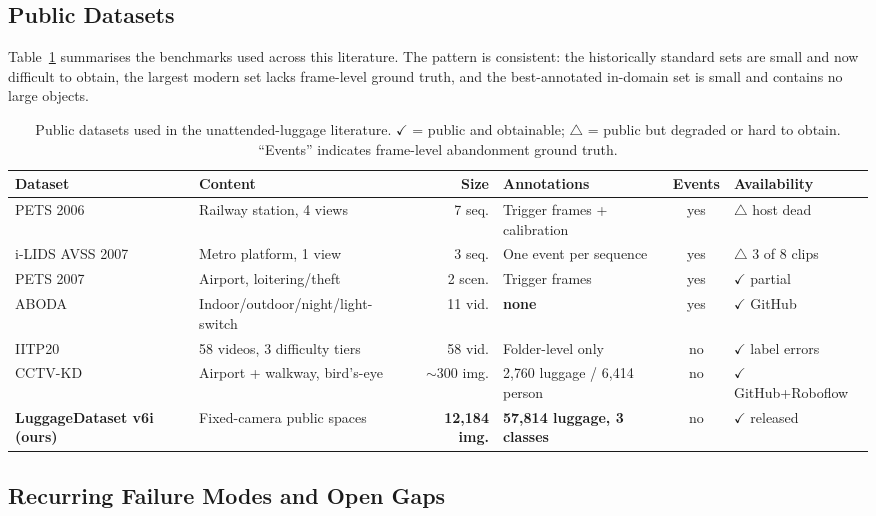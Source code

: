 \documentclass[10pt,twocolumn,a4paper]{article}
\begin{document}
\subsection{Public Datasets}

Table~\ref{tab:datasets} summarises the benchmarks used across this literature.
The pattern is consistent: the historically standard sets are small and now
difficult to obtain, the largest modern set lacks frame-level ground truth, and
the best-annotated in-domain set is small and contains no large objects.

\begin{table}[t]
\centering
\caption{Public datasets used in the unattended-luggage literature.
$\checkmark$ = public and obtainable; $\triangle$ = public but degraded or hard to
obtain. ``Events'' indicates frame-level abandonment ground truth.}
\label{tab:datasets}
\footnotesize
\setlength{\tabcolsep}{5pt}
\begin{tabular}{@{}l l r l c l@{}}
\toprule
\textbf{Dataset} & \textbf{Content} & \textbf{Size} & \textbf{Annotations} & \textbf{Events} & \textbf{Availability} \\
\midrule
PETS 2006 & Railway station, 4 views & 7 seq. & Trigger frames + calibration & yes & $\triangle$ host dead \\
i-LIDS AVSS 2007 & Metro platform, 1 view & 3 seq. & One event per sequence & yes & $\triangle$ 3 of 8 clips \\
PETS 2007 & Airport, loitering/theft & 2 scen. & Trigger frames & yes & $\checkmark$ partial \\
ABODA & Indoor/outdoor/night/light-switch & 11 vid. & \textbf{none} & yes & $\checkmark$ GitHub \\
IITP20 & 58 videos, 3 difficulty tiers & 58 vid. & Folder-level only & no & $\checkmark$ label errors \\
CCTV-KD & Airport + walkway, bird's-eye & $\sim$300 img. & 2{,}760 luggage / 6{,}414 person & no & $\checkmark$ GitHub+Roboflow \\
\midrule
\textbf{LuggageDataset v6i (ours)} & Fixed-camera public spaces & \textbf{12{,}184 img.} & \textbf{57{,}814 luggage, 3 classes} & no & $\checkmark$ released \\
\bottomrule
\end{tabular}
\end{table}

\subsection{Recurring Failure Modes and Open Gaps}
\end{document}
